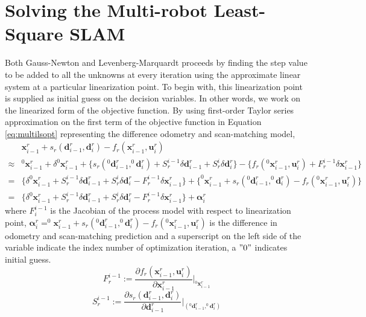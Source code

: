 \section{Solving the Multi-robot Least-Square SLAM}
Both Gauss-Newton and Levenberg-Marquardt proceeds by finding the step value to be added to all the unknowns at every iteration using the approximate linear system at a particular linearization point. To begin with, this linearization point is supplied as initial guess on the decision variables. In other words, we work on the linearized form of the objective function. By using first-order Taylor series approximation on the first term of the objective function in Equation \ref{eq:multilsopt} representing the difference odometry and scan-matching model,
\begin{align}
& \textbf{x}_{i-1}^r + s_r(\textbf{d}_{i-1}^r, \textbf{d}_i^r) - f_r(\textbf{x}_{i-1}^r,\textbf{u}_i^r) \\
\approx & ^0\textbf{x}_{i-1}^r + \delta ^0\textbf{x}^r_{i-1} + \{ s_r(^0\textbf{d}^r_{i-1}, ^0\textbf{d}^r_{i}) + S_r^{i-1}\delta \textbf{d}_{i-1}^r + S_r^{i} \delta \textbf{d}_i^r \} - \{ f_r(^0\textbf{x}_{i-1}^r, \textbf{u}_i^r) + F_r^{i-1}\delta\textbf{x}_{i-1}^r\}\\
= & \{ \delta ^0\textbf{x}^r_{i-1} + S_r^{i-1}\delta \textbf{d}_{i-1}^r + S_r^{i} \delta \textbf{d}_i^r - F_r^{i-1}\delta\textbf{x}_{i-1}^r \} + \{ ^0\textbf{x}_{i-1}^r + s_r(^0\textbf{d}^r_{i-1}, ^0\textbf{d}^r_{i}) - f_r(^0\textbf{x}_{i-1}^r, \textbf{u}_i^r) \} \\
= & \{ \delta ^0\textbf{x}^r_{i-1} + S_r^{i-1}\delta \textbf{d}_{i-1}^r + S_r^{i} \delta \textbf{d}_i^r - F_r^{i-1}\delta\textbf{x}_{i-1}^r \} + \pmb\alpha_i^r
\label{eq:proclin}
\end{align}
where $F_i^{i-1}$ is the Jacobian of the process model with respect to linearization point, $\pmb\alpha_i^r = ^0\textbf{x}_{i-1}^r + s_r(^0\textbf{d}^r_{i-1}, ^0\textbf{d}^r_{i}) - f_r(^0\textbf{x}_{i-1}^r, \textbf{u}_i^r)$ is the difference in odometry and scan-matching prediction and a superscript on the left side of the variable indicate the index number of optimization iteration, a $"0"$ indicates initial guess.
\begin{equation}
F_r^{i-1} := \frac{\partial f_r(\textbf{x}^r_{i-1}, \textbf{u}^r_{i})}{\partial \textbf{x}_{i-1}^r} \bigg\rvert_{^0\textbf{x}_{i-1}^r}
\end{equation}
\begin{equation}
S_r^{i-1} := \frac{\partial s_r(\textbf{d}^r_{i-1}, \textbf{d}^r_{i})}{\partial \textbf{d}_{i-1}^r} \bigg\rvert_{(^0\textbf{d}_{i-1}^r,^0\textbf{d}_{i}^r)}
\end{equation}
